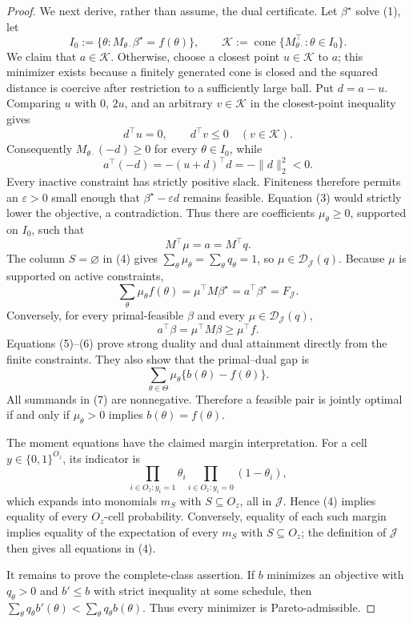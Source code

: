 \documentclass{article}
\begin{document}
\begin{proof}
We next derive, rather than assume, the dual certificate.  Let \(\beta^\star\) solve (1), let
\[
 I_0:=\{\theta:M_{\theta\cdot}\beta^\star=f(\theta)\},
 \quad\quad
 \mathcal K:=\operatorname{cone}\{M_{\theta\cdot}^{\top}:\theta\in I_0\}.
\]
We claim that \(a\in\mathcal K\).  Otherwise, choose a closest point \(u\in\mathcal K\) to \(a\); this minimizer exists because a finitely generated cone is closed and the squared distance is coercive after restriction to a sufficiently large ball.  Put \(d=a-u\).  Comparing \(u\) with \(0\), \(2u\), and an arbitrary \(v\in\mathcal K\) in the closest-point inequality gives
\[
 d^\top u=0,\quad\quad d^\top v\le0\quad(v\in\mathcal K).
\]
Consequently \(M_{\theta\cdot}(-d)\ge0\) for every \(\theta\in I_0\), while
\[
 a^\top(-d)=-(u+d)^\top d=-\|d\|_2^2<0. \tag{3}
\]
Every inactive constraint has strictly positive slack.  Finiteness therefore permits an \(\varepsilon>0\) small enough that \(\beta^\star-\varepsilon d\) remains feasible.  Equation (3) would strictly lower the objective, a contradiction.  Thus there are coefficients \(\mu_\theta\ge0\), supported on \(I_0\), such that
\[
 M^\top\mu=a=M^\top q. \tag{4}
\]
The column \(S=\varnothing\) in (4) gives \(\sum_\theta\mu_\theta=\sum_\theta q_\theta=1\), so \(\mu\in\mathcal D_{\mathcal J}(q)\).  Because \(\mu\) is supported on active constraints,
\[
 \sum_\theta\mu_\theta f(\theta)
 =\mu^\top M\beta^\star
 =a^\top\beta^\star=F_{\mathcal J}. \tag{5}
\]
Conversely, for every primal-feasible \(\beta\) and every \(\mu\in\mathcal D_{\mathcal J}(q)\),
\[
 a^\top\beta=\mu^\top M\beta\ge\mu^\top f. \tag{6}
\]
Equations (5)--(6) prove strong duality and dual attainment directly from the finite constraints.  They also show that the primal--dual gap is
\[
 \sum_{\theta\in\Theta}\mu_\theta\{b(\theta)-f(\theta)\}. \tag{7}
\]
All summands in (7) are nonnegative.  Therefore a feasible pair is jointly optimal if and only if \(\mu_\theta>0\) implies \(b(\theta)=f(\theta)\).

The moment equations have the claimed margin interpretation.  For a cell \(y\in\{0,1\}^{O_z}\), its indicator is
\[
 \prod_{i\in O_z:y_i=1}\theta_i
 \prod_{i\in O_z:y_i=0}(1-\theta_i),
\]
which expands into monomials \(m_S\) with \(S\subseteq O_z\), all in \(\mathcal J\).  Hence (4) implies equality of every \(O_z\)-cell probability.  Conversely, equality of each such margin implies equality of the expectation of every \(m_S\) with \(S\subseteq O_z\); the definition of \(\mathcal J\) then gives all equations in (4).

It remains to prove the complete-class assertion.  If \(b\) minimizes an objective with \(q_\theta>0\) and \(b'\le b\) with strict inequality at some schedule, then \(\sum_\theta q_\theta b'(\theta)<\sum_\theta q_\theta b(\theta)\).  Thus every minimizer is Pareto-admissible.


\end{proof}
\end{document}
